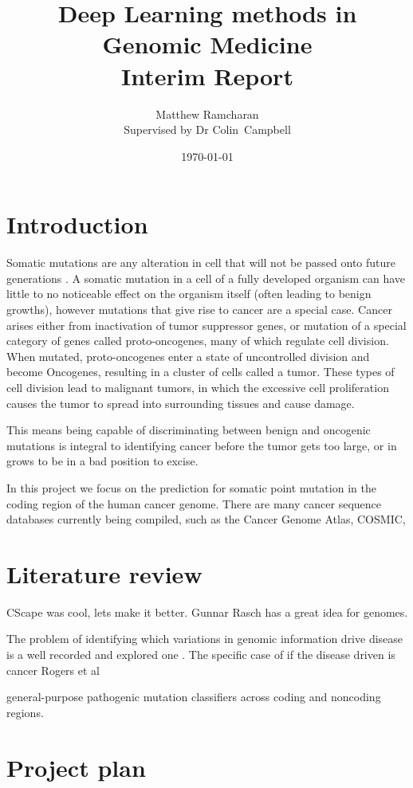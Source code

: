 \documentclass[11pt]{article}
\title{Deep Learning methods in Genomic Medicine\\ Interim Report}
\author{Matthew Ramcharan \\ Supervised by Dr Colin\ Campbell}
\date{\today}
\begin{document}
\maketitle

\section{Introduction}

Somatic mutations are any alteration in cell that will not be passed onto future generations \cite{Griffiths2000}. A somatic mutation in a cell of a fully developed organism can have little to no noticeable effect on the organism itself (often leading to benign growths), however mutations that give rise to cancer are a special case. Cancer arises either from inactivation of tumor suppressor genes, or mutation of a special category of genes called proto-oncogenes, many of which regulate cell division. When mutated, proto-oncogenes enter a state of uncontrolled division and become Oncogenes, resulting in a cluster of cells called a tumor.  
These types of cell division lead to malignant tumors, in which the excessive cell proliferation causes the tumor to spread into surrounding tissues and cause damage. 

This means being capable of discriminating between benign and oncogenic mutations is integral to identifying cancer before the tumor gets too large, or in grows to be in a bad position to excise. 

In this project we focus on the prediction for somatic point mutation in the coding region of the human cancer genome. There are many cancer sequence databases currently being compiled, such as the Cancer Genome Atlas, COSMIC, 


\section{Literature review}
CScape was cool, lets make it better.
Gunnar Rasch has a great idea for genomes.

The problem of identifying which variations in genomic information drive disease is a well recorded and explored one \cite{Rogers2017,Quang2015,Shihab2013}. The specific case of if the disease driven is cancer
Rogers et al \cite{Rogers2017}

general-purpose pathogenic mutation classifiers across coding and noncoding regions.

\section{Project plan}
\end{document}
